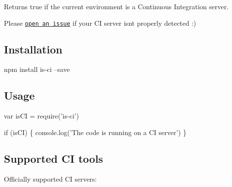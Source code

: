 Returns {\ttfamily true} if the current environment is a Continuous Integration server.

Please \href{https://github.com/watson/is-ci/issues}{\tt open an issue} if your CI server isn\textquotesingle{}t properly detected \+:)

\href{https://travis-ci.org/watson/is-ci}{\tt } \href{https://github.com/feross/standard}{\tt }

\subsection*{Installation}


\begin{DoxyCode}
npm install is-ci --save
\end{DoxyCode}


\subsection*{Usage}


\begin{DoxyCode}
var isCI = require('is-ci')

if (isCI) \{
  console.log('The code is running on a CI server')
\}
\end{DoxyCode}


\subsection*{Supported CI tools}

Officially supported CI servers\+:


